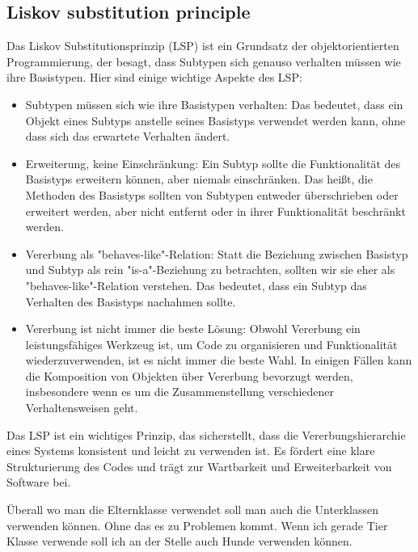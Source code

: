 \subsection*{Liskov substitution principle}
\label{LSP}
Das Liskov Substitutionsprinzip (LSP) ist ein Grundsatz der objektorientierten Programmierung, der besagt, dass Subtypen sich genauso verhalten müssen wie ihre Basistypen. Hier sind einige wichtige Aspekte des LSP:
\begin{itemize}
    \item Subtypen müssen sich wie ihre Basistypen verhalten: Das bedeutet, dass ein Objekt eines Subtyps anstelle seines Basistyps verwendet werden kann, ohne dass sich das erwartete Verhalten ändert.
    \item Erweiterung, keine Einschränkung: Ein Subtyp sollte die Funktionalität des Basistyps erweitern können, aber niemals einschränken. Das heißt, die Methoden des Basistyps sollten von Subtypen entweder überschrieben oder erweitert werden, aber nicht entfernt oder in ihrer Funktionalität beschränkt werden.
    \item Vererbung als "behaves-like"-Relation: Statt die Beziehung zwischen Basistyp und Subtyp als rein "is-a"-Beziehung zu betrachten, sollten wir sie eher als "behaves-like"-Relation verstehen. Das bedeutet, dass ein Subtyp das Verhalten des Basistyps nachahmen sollte.
    \item Vererbung ist nicht immer die beste Lösung: Obwohl Vererbung ein leistungsfähiges Werkzeug ist, um Code zu organisieren und Funktionalität wiederzuverwenden, ist es nicht immer die beste Wahl. In einigen Fällen kann die Komposition von Objekten über Vererbung bevorzugt werden, insbesondere wenn es um die Zusammenstellung verschiedener Verhaltensweisen geht.
\end{itemize}
        
Das LSP ist ein wichtiges Prinzip, das sicherstellt, dass die Vererbungshierarchie eines Systems konsistent und leicht zu verwenden ist. Es fördert eine klare Strukturierung des Codes und trägt zur Wartbarkeit und Erweiterbarkeit von Software bei.

Überall wo man die Elternklasse verwendet soll man auch die Unterklassen verwenden können. Ohne das es zu Problemen kommt. Wenn ich gerade Tier Klasse verwende soll ich an der Stelle auch Hunde verwenden können.

